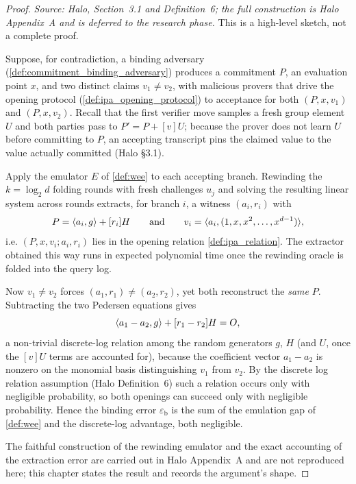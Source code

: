 \begin{proof}
  \textit{Source: Halo, Section~3.1 and Definition~6; the full construction is Halo
  Appendix~A and is deferred to the research phase.} This is a high-level sketch,
  not a complete proof.

  Suppose, for contradiction, a binding adversary
  (\cref{def:commitment_binding_adversary}) produces a commitment \(P\), an
  evaluation point \(x\), and two distinct claims \(v_{1} \neq v_{2}\), with
  malicious provers that drive the opening protocol
  (\cref{def:ipa_opening_protocol}) to acceptance for both \((P, x, v_{1})\) and
  \((P, x, v_{2})\). Recall that the first verifier move samples a fresh group
  element \(U\) and both parties pass to \(P' = P + [v]U\); because the prover does
  not learn \(U\) before committing to \(P\), an accepting transcript pins the
  claimed value to the value actually committed (Halo \S3.1).

  Apply the emulator \(E\) of \cref{def:wee} to each accepting branch. Rewinding
  the \(k = \log_{2} d\) folding rounds with fresh challenges \(u_{j}\) and solving
  the resulting linear system across rounds extracts, for branch \(i\), a witness
  \((a_{i}, r_{i})\) with
  \[
    P = \langle a_{i}, g \rangle + [r_{i}]H
    \qquad\text{and}\qquad
    v_{i} = \langle a_{i}, (1, x, x^{2}, \dots, x^{d-1}) \rangle,
  \]
  i.e. \((P, x, v_{i}; a_{i}, r_{i})\) lies in the opening relation
  \cref{def:ipa_relation}. The extractor obtained this way runs in expected
  polynomial time once the rewinding oracle is folded into the query log.

  Now \(v_{1} \neq v_{2}\) forces \((a_{1}, r_{1}) \neq (a_{2}, r_{2})\), yet both
  reconstruct the \emph{same} \(P\). Subtracting the two Pedersen equations gives
  \[
    \langle a_{1} - a_{2}, g \rangle + [r_{1} - r_{2}]H = O,
  \]
  a non-trivial discrete-log relation among the random generators \(g\), \(H\)
  (and \(U\), once the \([v]U\) terms are accounted for), because the coefficient
  vector \(a_{1} - a_{2}\) is nonzero on the monomial basis distinguishing
  \(v_{1}\) from \(v_{2}\). By the discrete log relation assumption (Halo
  Definition~6) such a relation occurs only with negligible probability, so both
  openings can succeed only with negligible probability. Hence the binding error
  \(\varepsilon_{\mathrm{b}}\) is the sum of the emulation gap of \cref{def:wee}
  and the discrete-log advantage, both negligible.

  The faithful construction of the rewinding emulator and the exact accounting of
  the extraction error are carried out in Halo Appendix~A and are not reproduced
  here; this chapter states the result and records the argument's shape.
\end{proof}
